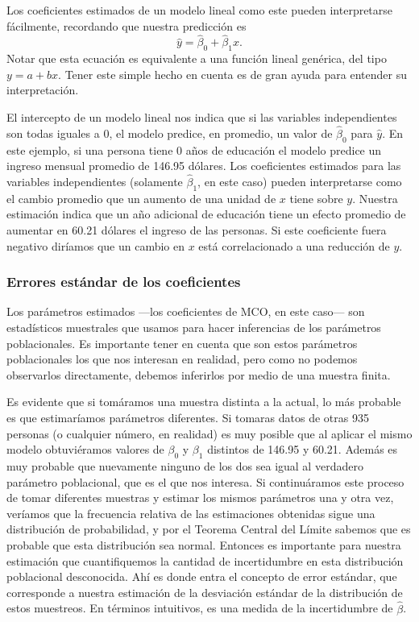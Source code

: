 \documentclass{article}\usepackage[]{graphicx}\usepackage[]{color}
\begin{document}
Los coeficientes estimados de un modelo lineal como este pueden interpretarse fácilmente, recordando que nuestra predicción es
\begin{equation*}
\hat y = \hat \beta_0 + \hat \beta_1 x.
\end{equation*}
Notar que esta ecuación es equivalente a una función lineal genérica, del tipo $y=a+bx$. Tener este simple hecho en cuenta es de gran ayuda para entender su interpretación.

El intercepto de un modelo lineal nos indica que si las variables independientes son todas iguales a 0, el modelo predice, en promedio, un valor de $\hat \beta_0$ para $\hat y$. En este ejemplo, si una persona tiene 0 años de educación el modelo predice un ingreso mensual promedio de 146.95 dólares.
Los coeficientes estimados para las variables independientes (solamente $\hat \beta_1$, en este caso) pueden interpretarse como el cambio promedio que un aumento de una unidad de $x$ tiene sobre $y$. Nuestra estimación indica que un año adicional de educación tiene un efecto promedio de aumentar en 60.21 dólares el ingreso de las personas. Si este coeficiente fuera negativo diríamos que un cambio en $x$ está correlacionado a una reducción de $y$.


\subsubsection{Errores estándar de los coeficientes}

Los parámetros estimados ---los coeficientes de MCO, en este caso--- son estadísticos muestrales que usamos para hacer inferencias de los parámetros poblacionales. Es importante tener en cuenta que son estos parámetros poblacionales los que nos interesan en realidad, pero como no podemos observarlos directamente, debemos inferirlos por medio de una muestra finita.

Es evidente que si tomáramos una muestra distinta a la actual, lo más probable es que estimaríamos parámetros diferentes. Si tomaras datos de otras 935 personas (o cualquier número, en realidad) es muy posible que al aplicar el mismo modelo obtuviéramos valores de $\beta_0$ y $\beta_1$ distintos de 146.95 y 60.21. Además es muy probable que nuevamente ninguno de los dos sea igual al verdadero parámetro poblacional, que es el que nos interesa. Si continuáramos este proceso de tomar diferentes muestras y estimar los mismos parámetros una y otra vez, veríamos que la frecuencia relativa de las estimaciones obtenidas sigue una distribución de probabilidad, y por el Teorema Central del Límite sabemos que es probable que esta distribución sea normal. Entonces es importante para nuestra estimación que cuantifiquemos la cantidad de incertidumbre en esta distribución poblacional desconocida. Ahí es donde entra el concepto de error estándar, que corresponde a nuestra estimación de la desviación estándar de la distribución de estos muestreos. En términos intuitivos, es una medida de la incertidumbre de $\hat\beta$.
\end{document}
